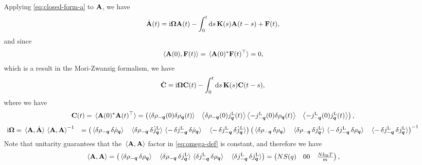 \documentclass[hyperref, a4paper]{article}
\newcommand*{\ii}{\mathrm{i}}
\def\\{}%
\begin{document}
Applying \eqref{eq:closed-form-a} to $\vb{A}$, we have 
\[
    \dot{\vb{A}}(t)= \ii \vb{\Omega} \vb{A}(t) - \int_{0}^{t} \dd{s} \vb{K}(s) \vb{A}(t-s)+ \vb{F}(t),
\]
and since 
\[
    \expval*{\vb{A}(0), \vb{F}(t)} = \expval*{\vb{A}(0)^* \vb{F}(t)^\top} = 0, 
\]
which is a result in the Mori-Zwanzig formalism, we have 
\begin{equation}
    \dot{\vb{C}} = \ii \vb{\Omega} \vb{C}(t) - \int_{0}^{t} \dd{s} \vb{K}(s) \vb{C}(t-s),
    \label{eq:matrix-eq}
\end{equation}
where we have 
\begin{equation}
    \vb{C}(t) = \expval*{\vb{A}(0)^* \vb{A}(t)^\top} = \pmqty{\left\langle\delta \rho_{-\vb*{q}}(0) \delta \rho_{\vb*{q}}(t)\right\rangle & \left\langle\delta \rho_{-\vb*{q}}(0) j_{\vb*{q}}^\text{L}(t)\right\rangle \\
    \left\langle - j_{-\vb*{q}}^\text{L}(0) \delta \rho_{\vb*{q}}(t)\right\rangle & \left\langle - j_{-\vb*{q}}^\text{L}(0) j_{\vb*{q}}^\text{L}(t)\right\rangle},
    \label{eq:c-eq}
\end{equation}
\begin{equation}
    \begin{aligned}
        \ii \vb{\Omega} &= \expval*{\vb{A}, \dot{\vb{A}}} \expval*{\vb{A}, \vb{A}}^{-1} \\
        &= \pmqty{ 
            \expval*{\var{\rho_{-\vb*{q}}} \var{\dot{\rho}_{\vb*{q}}} } &
            \expval*{\var{\rho_{-\vb*{q}}} \var{\dot{j}^\text{L}_{\vb*{q}}} } \\
            \expval*{-\var{j^\text{L}_{-\vb*{q}}} \var{\dot{\rho}_{\vb*{q}}} } &
            \expval*{-\var{j^\text{L}_{-\vb*{q}}} \var{\dot{j}^\text{L}_{\vb*{q}}} }} 
        \pmqty{ 
            \expval*{\var{\rho_{-\vb*{q}}} \var{{\rho}_{\vb*{q}}} } &
            \expval*{\var{\rho_{-\vb*{q}}} \var{{j}^\text{L}_{\vb*{q}}} } \\
            \expval*{-\var{j^\text{L}_{-\vb*{q}}} \var{{\rho}_{\vb*{q}}} } &
            \expval*{-\var{j^\text{L}_{-\vb*{q}}} \var{{j}^\text{L}_{\vb*{q}}} } }^{-1}
    \end{aligned}
    \label{eq:omega-def}
\end{equation}
Note that unitarity guarantees that the $\expval*{\vb{A}, \vb{A}}$ factor in \eqref{eq:omega-def} is constant,
and therefore we have 
\begin{equation}
    \expval*{\vb{A}, \vb{A}} = \pmqty{ 
            \expval*{\var{\rho_{-\vb*{q}}} \var{{\rho}_{\vb*{q}}} } &
            \expval*{\var{\rho_{-\vb*{q}}} \var{{j}^\text{L}_{\vb*{q}}} } \\
            \expval*{\var{j^\text{L}_{-\vb*{q}}} \var{{\rho}_{\vb*{q}}} } &
            \expval*{\var{j^\text{L}_{-\vb*{q}}} \var{{j}^\text{L}_{\vb*{q}}} } 
        } = \pmqty{
            N S(q) & 0 \\ 
            0 &  \frac{N k_\text{B} T}{m}
        },
    \label{eq:normalize}
\end{equation}
\end{document}
